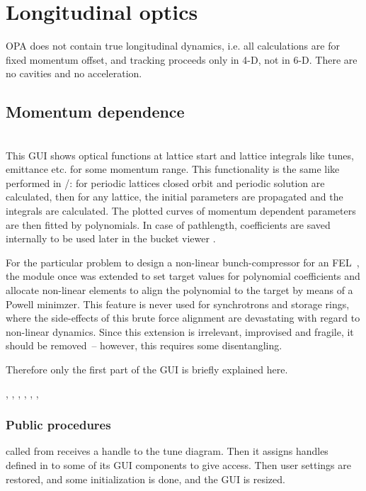 \documentclass[12pt]{article}
\newcommand\code[1]{{\tt #1}}
\newcommand\guico[1]{{\color{blue}\code{#1}}}
\newcommand{\opagui}[1]{\colorbox{blue!20}{{\color{black}\code{#1}}}}
\newcommand{\oguih}[2]{\subsection{\label{#2}#1}{\Huge\opagui{#2}}\\}
\newcommand{\ogui}[1]{\hyperref[#1]{\opagui{#1}}}
\newcommand{\opaguif}[1]{\colorbox{violet!30}{{\color{black}\code{#1}}}}
\newcommand{\oguif}[1]{\hyperref[#1]{\opaguif{#1}}}
\newcommand{\opauni}[1]{\colorbox{orange!30}{{\color{black}\code{#1}}}}
\newcommand{\ouni}[1]{\hyperref[#1]{\opauni{#1}}}
\newcommand{\uses}[1]{\flushleft {\bf Uses:} #1}
\newcommand{\desc}[1]{#1}
\newcommand{\ppro}[1]{\subsubsection*{Public procedures} #1}
\newcommand{\todo}[1]{{\color{red} #1}}
\begin{document}
\section{\label{secmomo}Longitudinal optics}
OPA does not contain true longitudinal dynamics, i.e. all calculations are for fixed momentum offset, and tracking proceeds only in 4-D, not in 6-D. There are no cavities and no acceleration.


\oguih{Momentum dependence}{opamomentum}

\desc{This GUI shows optical functions at lattice start and lattice integrals like tunes, emittance etc. for some momentum range. This functionality is the same like performed in \ogui{opalinop}/\ouni{linoplib}: for periodic lattices closed orbit and periodic solution are calculated, then for any lattice, the initial parameters are propagated and the integrals are calculated. The plotted curves of momentum dependent parameters are then fitted by polynomials. In case of pathlength, coefficients are saved internally to be used later in the bucket viewer \ogui{opabucket}.

\todo{For the particular problem to design a non-linear bunch-compressor for an FEL~\cite{nlbuco}, the module once was extended to set target values for polynomial coefficients and allocate non-linear elements to align the polynomial to the target by means of a Powell minimzer. This feature is never used for synchrotrons and storage rings, where the side-effects of this brute force alignment are devastating with regard to non-linear dynamics. Since this extension is irrelevant, improvised and fragile, it should be removed~-- however, this requires some disentangling.}

Therefore only the first part of the GUI is briefly explained here.
}

\uses{\ouni{momentumlib}, \ouni{linoplib}, \ogui{opatunediag}, \ouni{globlib}, \ouni{mathlib}, \oguif{../com/asfigure}, \ouni{../com/asaux}} 

\ppro{
\guico{Start} called from \ogui{opamenu} receives a handle to the tune diagram. Then it assigns handles defined in \ouni{momentumlib} to some of its GUI components to give \ouni{momentumlib} access. Then user settings are restored, and some initialization is done, and the GUI is resized.
}
\end{document}

